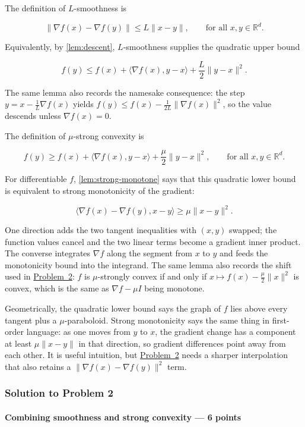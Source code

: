 \documentclass[11pt,a4paper]{article}
\newcommand{\jump}[2]{\hyperref[#1]{#2}}
\theoremstyle{definition}
\begin{document}
The definition of $L$-smoothness is

\[
\|\nabla f(x)-\nabla f(y)\|
\leq L\|x-y\|,
\qquad \text{for all }x,y\in\mathbb{R}^d.
\]

Equivalently, by \cref{lem:descent}, $L$-smoothness supplies the quadratic upper bound

\[
f(y)\leq f(x)+\langle\nabla f(x),y-x\rangle+\frac{L}{2}\|y-x\|^2.
\]

The same lemma also records the namesake consequence: the step $y=x-\frac1L\nabla f(x)$ yields $f(y)\le f(x)-\frac1{2L}\|\nabla f(x)\|^2$, so the value descends unless $\nabla f(x)=0$.

The definition of $\mu$-strong convexity is

\[
f(y)\geq f(x)+\langle\nabla f(x),y-x\rangle+\frac{\mu}{2}\|y-x\|^2,
\qquad \text{for all }x,y\in\mathbb{R}^d.
\]

For differentiable $f$, \cref{lem:strong-monotone} says that this quadratic lower bound is equivalent to strong monotonicity of the gradient:

\[
\langle\nabla f(x)-\nabla f(y),x-y\rangle
\geq\mu\|x-y\|^2.
\]

One direction adds the two tangent inequalities with $(x,y)$ swapped; the function values cancel and the two linear terms become a gradient inner product. The converse integrates $\nabla f$ along the segment from $x$ to $y$ and feeds the monotonicity bound into the integrand. The same lemma also records the shift used in \jump{prob:spr2025-opt-2}{Problem~2}: $f$ is $\mu$-strongly convex if and only if $x\mapsto f(x)-\frac{\mu}{2}\|x\|^2$ is convex, which is the same as $\nabla f-\mu I$ being monotone.

Geometrically, the quadratic lower bound says the graph of $f$ lies above every tangent plus a $\mu$-paraboloid. Strong monotonicity says the same thing in first-order language: as one moves from $y$ to $x$, the gradient change has a component at least $\mu\|x-y\|$ in that direction, so gradient differences point away from each other. It is useful intuition, but \jump{prob:spr2025-opt-2}{Problem~2} needs a sharper interpolation that also retains a $\|\nabla f(x)-\nabla f(y)\|^2$ term.

\subsubsection{Solution to Problem 2}\label{sol:spr2025-opt-2}

\paragraph{Combining smoothness and strong convexity --- 6 points}
\end{document}
